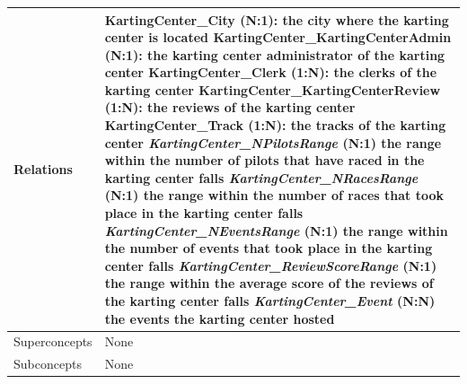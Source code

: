\documentclass{beamer}
\begin{document}
\begin{frame}
\begin{table}
\tiny
\begin{tabular}{|p{2cm}|p{6cm}|}
\hline
Relations &
KartingCenter\_City (N:1): the city where the karting center is located \newline
KartingCenter\_KartingCenterAdmin (N:1): the karting center administrator of the karting center \newline
KartingCenter\_Clerk (1:N): the clerks of the karting center \newline
KartingCenter\_KartingCenterReview (1:N): the reviews of the karting center \newline
KartingCenter\_Track (1:N): the tracks of the karting center \newline
\textit{KartingCenter\_NPilotsRange} (N:1) the range within the number of pilots that have raced in the karting center falls \newline
\textit{KartingCenter\_NRacesRange} (N:1) the range within the number of races that took place in the karting center falls \newline
\textit{KartingCenter\_NEventsRange} (N:1) the range within the number of events that took place in the karting center falls \newline
\textit{KartingCenter\_ReviewScoreRange} (N:1) the range within the average score of the reviews of the karting center falls \newline
\textit{KartingCenter\_Event} (N:N) the events the karting center hosted \\
\hline
Superconcepts & None \\
\hline
Subconcepts & None \\
\hline
\end{tabular}
\end{table}
\end{frame}
\end{document}
